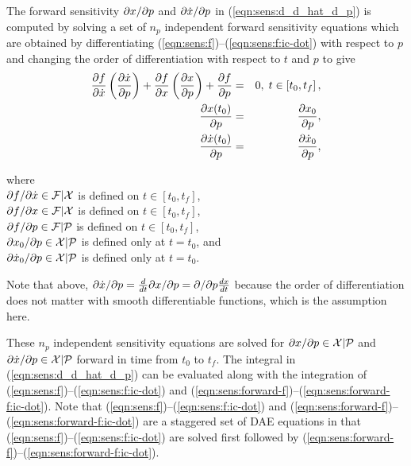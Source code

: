 \documentclass[pdf,ps2pdf,11pt]{SANDreport}
\begin{document}
The forward sensitivity $\partial x / \partial p$ and $\partial \dot{x} / \partial p$ in
(\ref{eqn:sens:d_d_hat_d_p}) is computed by solving a set of
$n_p$ independent forward sensitivity equations which are obtained by
differentiating
(\ref{eqn:sens:f})--(\ref{eqn:sens:f:ic-dot}) with
respect to $p$ and changing the order of differentiation with respect to $t$
and $p$ to give
%
\begin{eqnarray}
\displaystyle{\frac{\partial f}{\partial \dot{x}}} \left(\displaystyle{\frac{\partial \dot{x}}{\partial p}} \right) + \displaystyle{\frac{\partial f}{\partial x}} \left(\displaystyle{\frac{\partial x}{\partial p}}\right)
+ \displaystyle{\frac{\partial f}{\partial p}} & = & 0, \; t \in \left[ t_0, t_f \right], \label{eqn:sens:forward-f} \\
\displaystyle{\frac{\partial x(t_0)}{\partial p}} & = & \displaystyle{\frac{\partial x_0}{\partial p}}, \label{eqn:sens:forward-f:ic} \\
\displaystyle{\frac{\partial \dot{x}(t_0)}{\partial p}} & = & \displaystyle{\frac{\partial \dot{x}_0}{\partial p}}, \label{eqn:sens:forward-f:ic-dot}
\end{eqnarray}
\begin{tabbing}
\hspace{4ex}where\hspace{1ex}\= \\
\>	$\partial f / \partial \dot{x} \in \mathcal{F}|\mathcal{X}$ is defined on $t\in[t_0,t_f]$, \\
\>	$\partial f / \partial x \in \mathcal{F}|\mathcal{X}$ is defined on $t\in[t_0,t_f]$, \\
\>	$\partial f / \partial p \in \mathcal{F}|\mathcal{P}$ is defined on $t\in[t_0,t_f]$, \\
\>	$\partial x_0 / \partial p \in \mathcal{X}|\mathcal{P}$ is defined only at $t=t_0$, and \\
\>	$\partial \dot{x}_0 / \partial p \in \mathcal{X}|\mathcal{P}$ is defined only at $t=t_0$.
\end{tabbing}

Note that above, $\partial \dot{x} / \partial p = \frac{d}{dt} {}\partial x / \partial p = \partial  / \partial p
{}\frac{dx}{dt}$ because the order of differentiation does not matter with
smooth differentiable functions, which is the assumption here.

These $n_p$ independent sensitivity equations are solved for $\partial x / \partial p
{}\in\mathcal{X}|\mathcal{P}$ and $\partial \dot{x} / \partial p
{}\in\mathcal{X}|\mathcal{P}$ forward in time from $t_0$ to $t_f$.  The
integral in (\ref{eqn:sens:d_d_hat_d_p}) can be evaluated along
with the integration of
(\ref{eqn:sens:f})--(\ref{eqn:sens:f:ic-dot}) and
(\ref{eqn:sens:forward-f})--(\ref{eqn:sens:forward-f:ic-dot}).
Note that (\ref{eqn:sens:f})--(\ref{eqn:sens:f:ic-dot})
and
(\ref{eqn:sens:forward-f})--(\ref{eqn:sens:forward-f:ic-dot})
are a staggered set of DAE equations in that
(\ref{eqn:sens:f})--(\ref{eqn:sens:f:ic-dot}) are solved
first followed by
(\ref{eqn:sens:forward-f})--(\ref{eqn:sens:forward-f:ic-dot}).
\end{document}
